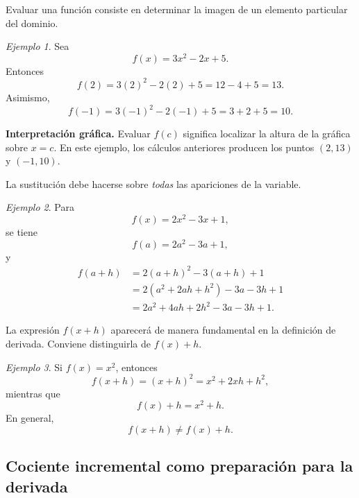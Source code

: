 \documentclass[12pt]{article}
\theoremstyle{remark}
\newtheorem{ejemplo}{Ejemplo}[section]
\begin{document}
Evaluar una función consiste en determinar la imagen de un elemento particular
del dominio.

\begin{ejemplo}
Sea
\[
f(x)=3x^2-2x+5.
\]
Entonces
\[
f(2)=3(2)^2-2(2)+5=12-4+5=13.
\]
Asimismo,
\[
f(-1)=3(-1)^2-2(-1)+5=3+2+5=10.
\]

\textbf{Interpretación gráfica.} Evaluar $f(c)$ significa localizar la altura
de la gráfica sobre $x=c$. En este ejemplo, los cálculos anteriores producen
los puntos $(2,13)$ y $(-1,10)$.
\begin{center}
\end{center}
\end{ejemplo}

La sustitución debe hacerse sobre \emph{todas} las apariciones de la variable.

\begin{ejemplo}
Para
\[
f(x)=2x^2-3x+1,
\]
se tiene
\[
f(a)=2a^2-3a+1,
\]
y
\begin{align*}
f(a+h)
 &=2(a+h)^2-3(a+h)+1\\
 &=2(a^2+2ah+h^2)-3a-3h+1\\
 &=2a^2+4ah+2h^2-3a-3h+1.
\end{align*}
\end{ejemplo}

La expresión $f(x+h)$ aparecerá de manera fundamental en la definición de
derivada. Conviene distinguirla de $f(x)+h$.

\begin{ejemplo}
Si $f(x)=x^2$, entonces
\[
f(x+h)=(x+h)^2=x^2+2xh+h^2,
\]
mientras que
\[
f(x)+h=x^2+h.
\]
En general,
\[
f(x+h)\neq f(x)+h.
\]
\end{ejemplo}

\subsection{Cociente incremental como preparación para la derivada}
\end{document}
